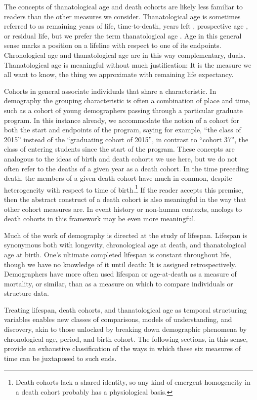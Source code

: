 \documentclass[12pt,oneside,a4paper]{article} %
\begin{document}
The concepts of thanatological age and death cohorts are likely less familiar to
readers than the other measures we consider. Thanatological age is sometimes
referred to as remaining years of life, time-to-death, years left
\citep{vaupel2009life, villavicencioRiffeSymmetires2016}, prospective age
\citep{sanderson2007new}, or residual life, but we prefer the term thanatological age \citep{riffe2015force}. Age in this general sense marks a position on a lifeline with respect to one of its
endpoints. Chronological age and thanatological age are in this way
complementary, duals. Thanatological age is meaningful without much
justification: It is the measure we all want to know, the thing we approximate
with remaining life expectancy.

Cohorts in general associate individuals that share a characteristic. In
demography the grouping characteristic is often a combination of place and time, such as
a cohort of young demographers passing through a particular graduate program.
In this instance already, we accommodate the notion of a cohort for both the
start and endpoints of the program, saying for example, ``the class of 2015''
instead of the ``graduating cohort of 2015'', in contrast to ``cohort 37'', the
 class of entering students since the start of the program. These concepts are analogous to the ideas of
birth and death cohorts we use here, but we do not often refer to the deaths of a given year as a death cohort.
In the time preceding death, the members of a given death cohort have much in common, despite
heterogeneity with respect to time of birth.\footnote{Death cohorts lack a
shared identity, so any kind of emergent homogeneity in a death cohort probably
has a physiological basis.} If the reader accepts this premise, then the
abstract construct of a death cohort is also meaningful in the way that other
cohort measures are. In event history or non-human contexts, anologs to death
cohorts in this framework may be even more meaningful.

Much of the work of demography is directed at the study of lifespan. Lifespan is
synonymous both with longevity, chronological age at death, and thanatological
age at birth. One's ultimate completed lifespan is constant throughout life,
though we have no knowledge of it until death: It is assigned retrospectively.
Demographers have more often used lifespan or age-at-death as a measure of
mortality, or similar, than as a measure on which to compare individuals or
structure data.

Treating lifespan,
death cohorts, and thanatological age as temporal structuring variables
enables new classes of comparisons, models of understanding, and discovery,
akin to those unlocked by breaking down demographic phenomena by chronological age,
period, and birth cohort. The following sections, in this sense, provide an
exhaustive classification of the ways in which these six measures of time can be juxtaposed to such ends.
\end{document}
